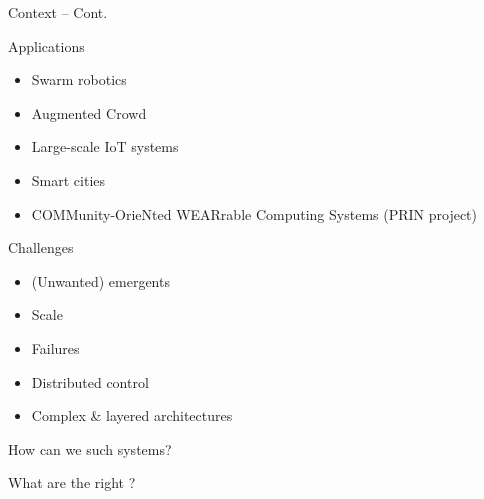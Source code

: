 \documentclass[presentation, 8pt,169]{beamer}\mode<presentation>{\usetheme{AMSBolognaFC}}
\begin{document}
\begin{frame}{Context -- Cont.}
\begin{alertblock}{Applications}
  \begin{multicols}{3}
    \begin{itemize}
      \item Swarm robotics
      \item Augmented Crowd
      \item Large-scale IoT systems
      \item Smart cities
      \item COMMunity-OrieNted WEARrable Computing Systems (PRIN project)
    \end{itemize}
  \end{multicols}
\end{alertblock}

\begin{block}{Challenges}
  \begin{multicols}{3}
    \begin{itemize}
      \item (Unwanted) emergents
      \item Scale
      \item Failures
      \item Distributed control
      \item Complex \& layered architectures
    \end{itemize}
  \end{multicols}
\end{block}
\begin{center}
  \Large{How can we  such systems?}
  \end{center}
  \begin{center}
    \Large{What are the right ?}
  \end{center}
\centering
\end{frame}
\end{document}
